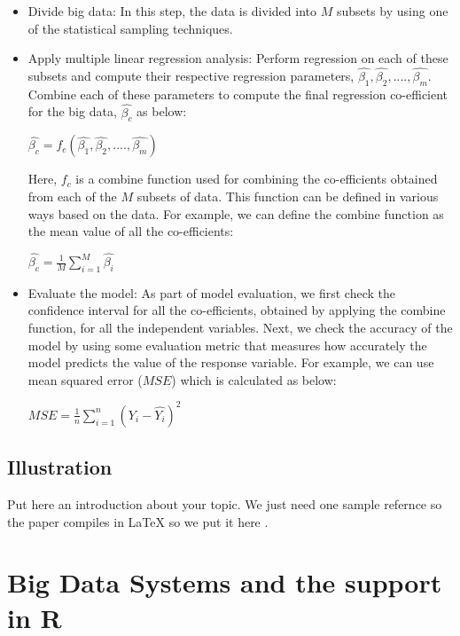\documentclass[sigconf]{acmart}
\begin{document}
\begin{itemize}
	\item Divide big data: In this step, the data is divided into $M$ subsets by using one of the statistical sampling techniques.
	\item Apply multiple linear regression analysis: Perform regression on each of these subsets and compute their respective regression parameters, $\hat{\beta_1}, \hat{\beta_2}, ...., \hat{\beta_m}$. Combine each of these parameters to compute the final regression co-efficient for the big data, $\hat{\beta_c}$ as below:
	\begin{center}$\hat{\beta_c} = f_c(\hat{\beta_1}, \hat{\beta_2}, ...., \hat{\beta_m})$\end{center}
	Here, $f_c$ is a combine function used for combining the co-efficients obtained from each of the $M$ subsets of data. This function can be defined in various ways based on the data. For example, we can define the combine function as the mean value of all the co-efficients: 
	\begin{center} $\hat{\beta_c} = \frac{1}{M}\sum_{i=1}^M \hat{\beta_i}$ \end{center}
	\item Evaluate the model: As part of model evaluation, we first check the confidence interval for all the co-efficients, obtained by applying the combine function, for all the independent variables. Next, we check the accuracy of the model by using some evaluation metric that measures how accurately the model predicts the value of the response variable. For example, we can use mean squared error ($MSE$) which is calculated as below:
	\begin{center} $MSE = \frac{1}{n}\sum_{i=1}^n (Y_i - \hat{Y_i})^2$ \end{center}
\end{itemize} 

\subsection{Illustration}

Put here an introduction about your topic. 
We just need one sample refernce so the paper compiles in LaTeX so we
put it here \cite{editor00}.

\section{Big Data Systems and the support in R}
\end{document}
